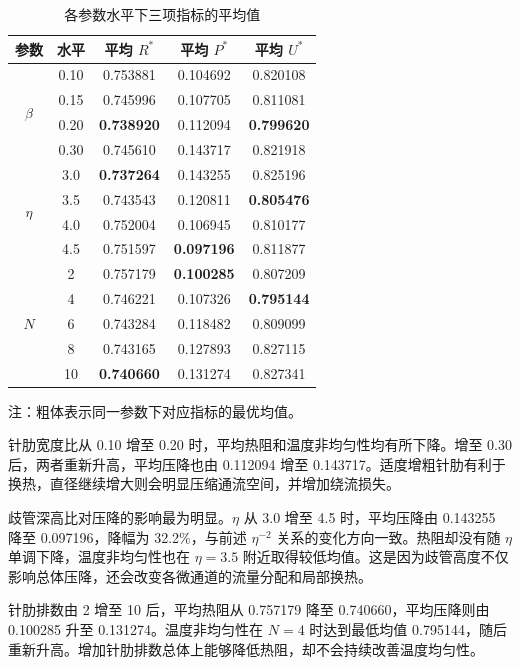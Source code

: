 \documentclass[withoutpreface,bwprint]{cumcmthesis}
\newcommand{\Rstar}{R^{*}}
\newcommand{\Pstar}{P^{*}}
\newcommand{\Ustar}{U^{*}}
\begin{document}
\begin{table}[H]
\centering
\caption{各参数水平下三项指标的平均值}
\label{tab:means}
\begin{tabular}{ccccc}
\toprule
参数 & 水平 & 平均 $\Rstar$ & 平均 $\Pstar$ & 平均 $\Ustar$\\
\midrule
\multirow{4}{*}{$\beta$} & 0.10 & 0.753881 & 0.104692 & 0.820108\\
 & 0.15 & 0.745996 & 0.107705 & 0.811081\\
 & 0.20 & \textbf{0.738920} & 0.112094 & \textbf{0.799620}\\
 & 0.30 & 0.745610 & 0.143717 & 0.821918\\
\midrule
\multirow{4}{*}{$\eta$} & 3.0 & \textbf{0.737264} & 0.143255 & 0.825196\\
 & 3.5 & 0.743543 & 0.120811 & \textbf{0.805476}\\
 & 4.0 & 0.752004 & 0.106945 & 0.810177\\
 & 4.5 & 0.751597 & \textbf{0.097196} & 0.811877\\
\midrule
\multirow{5}{*}{$N$} & 2 & 0.757179 & \textbf{0.100285} & 0.807209\\
 & 4 & 0.746221 & 0.107326 & \textbf{0.795144}\\
 & 6 & 0.743284 & 0.118482 & 0.809099\\
 & 8 & 0.743165 & 0.127893 & 0.827115\\
 & 10 & \textbf{0.740660} & 0.131274 & 0.827341\\
\bottomrule
\end{tabular}
\parbox{0.82\textwidth}{\footnotesize 注：粗体表示同一参数下对应指标的最优均值。}
\end{table}

针肋宽度比从 0.10 增至 0.20 时，平均热阻和温度非均匀性均有所下降。增至 0.30 后，两者重新升高，平均压降也由 0.112094 增至 0.143717。适度增粗针肋有利于换热，直径继续增大则会明显压缩通流空间，并增加绕流损失。

歧管深高比对压降的影响最为明显。$\eta$ 从 3.0 增至 4.5 时，平均压降由 0.143255 降至 0.097196，降幅为 32.2\%，与前述 $\eta^{-2}$ 关系的变化方向一致。热阻却没有随 $\eta$ 单调下降，温度非均匀性也在 $\eta=3.5$ 附近取得较低均值。这是因为歧管高度不仅影响总体压降，还会改变各微通道的流量分配和局部换热。

针肋排数由 2 增至 10 后，平均热阻从 0.757179 降至 0.740660，平均压降则由 0.100285 升至 0.131274。温度非均匀性在 $N=4$ 时达到最低均值 0.795144，随后重新升高。增加针肋排数总体上能够降低热阻，却不会持续改善温度均匀性。
\end{document}
